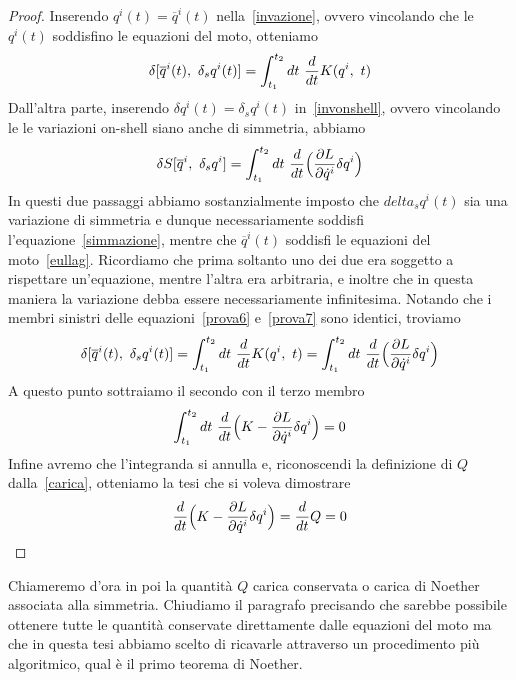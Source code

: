     \begin{proof}
        Inserendo $q^i(t) = \overline q^i(t)$ nella~\eqref{invazione}, ovvero vincolando che le $q^i(t)$ soddisfino le equazioni del moto, otteniamo 
    \begin{equation}\label{prova6}
        \delta[\overline q^i(t), ~\delta_s q^i(t)] = \int_{t_1}^{t_2}dt~ \frac{d}{dt} K(q^i, ~t)
    \end{equation}
        Dall'altra parte, inserendo $\delta q^i(t) = \delta_s q^i(t)$ in~\eqref{invonshell}, ovvero vincolando le le variazioni on-shell siano anche di simmetria, abbiamo
    \begin{equation}\label{prova7}
        \delta S[\overline q^i,~\delta_s q^i] = \int_{t_1}^{t_2}dt~ \frac{d}{dt} \Big( \frac{\partial L}{\partial\dot q^i} \delta q^i \Big )
    \end{equation}
        In questi due passaggi abbiamo sostanzialmente imposto che $delta_s q^i(t)$ sia una variazione di simmetria e dunque necessariamente soddisfi l'equazione~\eqref{simmazione}, mentre che $\overline q^i(t)$ soddisfi le equazioni del moto~\eqref{eullag}. Ricordiamo che prima soltanto uno dei due era soggetto a rispettare un'equazione, mentre l'altra era arbitraria, e inoltre che in questa maniera la variazione debba essere necessariamente infinitesima. Notando che i membri sinistri delle equazioni~\eqref{prova6} e~\eqref{prova7} sono identici, troviamo
    \begin{equation}
        \delta[\overline q^i(t), ~\delta_s q^i(t)] = \int_{t_1}^{t_2}dt~ \frac{d}{dt} K(q^i, ~t) = \int_{t_1}^{t_2}dt~ \frac{d}{dt} \Big( \frac{\partial L}{\partial\dot q^i} \delta q^i \Big )
    \end{equation}
        A questo punto sottraiamo il secondo con il terzo membro
    \begin{equation}
        \int_{t_1}^{t_2}dt~ \frac{d}{dt} \Big (K - \frac{\partial L}{\partial\dot q^i} \delta q^i \Big ) = 0
    \end{equation}
        Infine avremo che l'integranda si annulla e, riconoscendi la definizione di $Q$ dalla~\eqref{carica}, otteniamo la tesi che si voleva dimostrare
    \begin{equation}
        \frac{d}{dt} \Big (K - \frac{\partial L}{\partial\dot q^i} \delta q^i \Big ) = \frac{d}{dt} Q = 0
    \end{equation}
    \end{proof}
    Chiameremo d'ora in poi la quantità $Q$ carica conservata o carica di Noether associata alla simmetria. Chiudiamo il paragrafo precisando che sarebbe possibile ottenere tutte le quantità conservate direttamente dalle equazioni del moto ma che in questa tesi abbiamo scelto di ricavarle attraverso un procedimento più algoritmico, qual è il primo teorema di Noether. 

